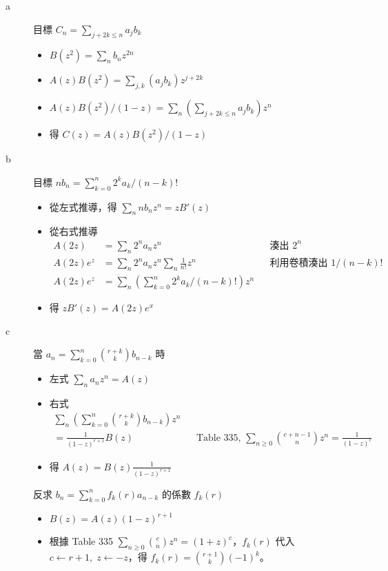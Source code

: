 \documentclass[11pt,fleqn]{article}
\begin{document}
\begin{description}
	\item[a]
		目標 $C_n = \sum_{j+2k \le n} a_j b_k$
		\begin{itemize}
			\item $B(z^2) = \sum_n b_n z^{2n}$
			\item $A(z) B(z^2) = \sum_{j,k} (a_j b_k) z^{j+2k}$
			\item $A(z) B(z^2) / (1-z) = \sum_n (\sum_{j+2k \le n} a_j b_k) z^n$
			\item 得 $C(z) = A(z) B(z^2) / (1-z)$
		\end{itemize}
	\item[b]
		目標 $n b_n = \sum_{k=0}^{n} 2^k a_k / (n-k)!$
		\begin{itemize}
			\item 從左式推導，得 $\sum_n n b_n z^n = z B'(z)$
			\item 從右式推導
				\begin{align*}
					A(2z) &= \sum_n 2^n a_n z^n && \text{湊出 } 2^n\\
					A(2z) e^z &= \sum_n 2^n a_n z^n \sum_n \frac{1}{n!} z^n && \text{利用卷積湊出 } 1/(n-k)!\\
					A(2z) e^z &= \sum_n (\sum_{k=0}^n 2^k a_k /(n-k)!) z^n
				\end{align*}
			\item 得 $z B'(z) = A(2z) e^x$
		\end{itemize}
	\item[c]
		當 $a_n = \sum_{k=0}^{n} \binom{r+k}{k} b_{n-k}$ 時
		\begin{itemize}
			\item 左式 $\sum_n a_n z^n = A(z)$
			\item 右式 
				\begin{align*}
					\sum_n ( \sum_{k=0}^{n} \binom{r+k}{k} b_{n-k}) z^n \\
						= \frac{1}{(1-z)^{r+1}} B(z) && \text{Table 335, }
							\sum_{n \ge 0} \binom{c+n-1}{n} z^n =
							\frac{1}{(1-z)^c}
				\end{align*}
			\item 得 $A(z) = B(z) \frac{1}{(1-z)^{r+1}}$
		\end{itemize}
		反求 $b_n = \sum_{k=0}^{n} f_k(r) a_{n-k}$ 的係數 $f_k(r)$
		\begin{itemize}
			\item $B(z) = A(z) (1-z)^{r+1}$
			\item 根據 Table 335 $\sum_{n \ge 0} \binom{c}{n} z^n = (1+z)^c$，$f_k(r)$ 代入 $c \leftarrow r+1, \; z \leftarrow -z$，得 $f_k(r) = \binom{r+1}{k} (-1)^k$。
		\end{itemize}
\end{description}
\end{document}

